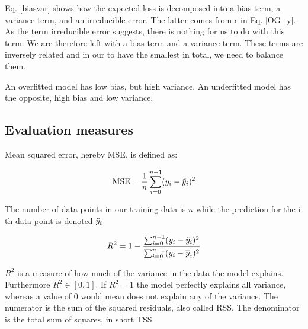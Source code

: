 Eq. \ref{biasvar} shows how the expected loss is decomposed into a bias term, a variance term, and an irreducible error. The latter comes from $\epsilon$ in Eq. \ref{OG_y}. As the term irreducible error suggests, there is nothing for us to do with this term. We are therefore left with a bias term and a variance term. These terms are inversely related and in our to have the smallest  in total, we need to balance them. 

An overfitted model has low bias, but high variance. An underfitted model has the opposite, high bias and low variance. 






\subsection{Evaluation measures}


Mean squared error, hereby MSE, is defined as: 

\begin{equation}\label{mse}
    \text{MSE} = \frac{1}{n}\sum_{i=0}^{n-1}(y_i-\Tilde{y}_i)^2
\end{equation}

The number of data points in our training data is $n$ while the prediction for the i-th data point is denoted $\Tilde{y}_i$

\begin{equation}
    R^2 = 1 - \frac{\sum_{i=0}^{n-1}(y_i-\Tilde{y}_i)^2}{\sum_{i=0}^{n-1}(y_i-\overline{y}_i)^2}
\end{equation}

$R^2$ is a measure of how much of the variance in the data the model explains.  Furthermore $R^2 \in [0,1]$. If $R^2 = 1$ the model perfectly explains all variance, whereas a value of 0 would mean does not explain any of the variance. The numerator is the sum of the squared residuals, also called RSS. The denominator is the total sum of squares, in short TSS. 

